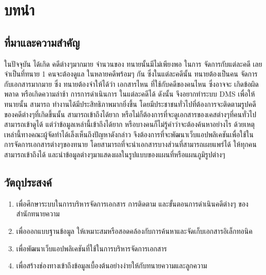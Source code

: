 \documentclass[12pt,oneside,openright,a4paper]{cpe-thai-project}
\begin{document}



\chapter{บทนำ}

\section{ที่มาและความสำคัญ}
\hspace*{1cm}ในปัจจุบัน ได้เกิด คดีต่างๆมากมาย จำนวนของ ทนายนั้นมีไม่เพียงพอ ในการ จัดการกับแต่ละคดี เลยจำเป็นที่ทนาย 1 คนจะต้องดูแล ในหลายคดีพร้อมๆ กัน ซึ่งในแต่ละคดีนั้น ทนายต้องเป็นคน จัดการกับเอกสารมากมาย ซึ่ง ทนายต้องจำให้ได้ว่า เอกสารไหน ที่ใช้กับคดีของคนไหน ซึ่งอาจจะ เกิดข้อผิด พลาด หรือเกิดความล่าช้า การการดำเนินการ ในแต่ละคดีได้ ดังนั้น จึงอยากทำระบบ DMS เพื่อให้ทนายนั้น สามารถ ทำงานได้มีประสิทธิภาพมากยิ่งขึ้น โดยมีประชาชนทั่วไปที่ต้องการจะติดตามรูปคดีของคดีต่างๆที่เกิดขึ้นนั้น สามารถเข้าถึงได้ยาก หรือไม่ก็ต้องการที่จะดูเอกสารของเคสต่างๆที่คนทั่วไปสามารถเข้าดูได้ แต่ว่าข้อมูลเหล่านี้เข้าถึงได้ยาก หรือบางคนก็ไม่รู้คำว่าจะต้องค้นหาอย่างไร \newline
\hspace*{1cm}ด้วยเหตุเหล่านี้ทางคณะผู้จัดทำได้เล็งเห็นถึงปัญหาดังกล่าว จึงต้องการที่จะพัฒนาเว็บแอปพลิเคชันเพื่อใช้ในการจัดการเอกสารต่างๆของทนาย โดยสามารถที่จะนำเอกสารบางส่วนที่สามารถเผยแพร่ได้ ให้ทุกคนสามารถเข้าถึงได้ และนำข้อมูลต่างๆมาแสดงผลในรูปแบบของแผนที่หรือแผนภูมิรูปต่างๆ

\section{วัตถุประสงค์}
\begin{enumerate}
  \item เพื่อศึกษาระบบในการบริหารจัดการเอกสาร การติดตาม และขั้นตอนการดำเนินคดีต่างๆ ของสำนักทนายความ
  \item เพื่อออกแบบฐานข้อมูล ให้เหมาะสมหรือสอดคล้องกับการค้นหาและจัดเก็บเอกสารอิเล็กทอนิค
  \item เพื่อพัฒนาเว็บแอปพลิเคชันที่ใช้ในการบริหารจัดการเอกสาร
  \item เพื่อสร้างช่องทางเข้าถึงข้อมูลเบื้องต้นอย่างง่ายให้กับทนายความและลูกความ
\end{enumerate}
\end{document}
